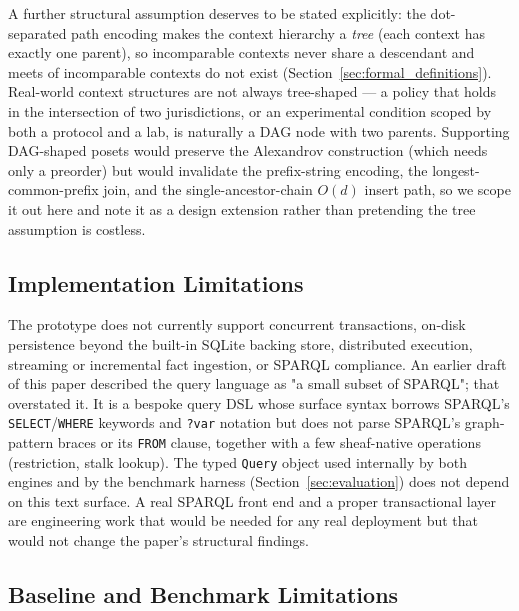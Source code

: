 A further structural assumption deserves to be stated explicitly: the
dot-separated path encoding makes the context hierarchy a \emph{tree}
(each context has exactly one parent), so incomparable contexts never
share a descendant and meets of incomparable contexts do not exist
(Section~\ref{sec:formal_definitions}). Real-world context structures
are not always tree-shaped --- a policy that holds in the intersection
of two jurisdictions, or an experimental condition scoped by both a
protocol and a lab, is naturally a DAG node with two parents. Supporting
DAG-shaped posets would preserve the Alexandrov construction (which
needs only a preorder) but would invalidate the prefix-string encoding,
the longest-common-prefix join, and the single-ancestor-chain
$O(d)$ insert path, so we scope it out here and note it as a design
extension rather than pretending the tree assumption is costless.

\subsection{Implementation Limitations}
\label{sec:limits:implementation}

The prototype does not currently support concurrent transactions, on-disk
persistence beyond the built-in SQLite backing store, distributed
execution, streaming or incremental fact ingestion, or SPARQL compliance.
An earlier draft of this paper described the query language as "a small
subset of SPARQL"; that overstated it. It is a bespoke query DSL whose
surface syntax borrows SPARQL's \texttt{SELECT}/\texttt{WHERE} keywords and
\texttt{?var} notation but does not parse SPARQL's graph-pattern braces or
its \texttt{FROM} clause, together with a few sheaf-native operations
(restriction, stalk lookup). The typed \texttt{Query} object used
internally by both engines and by the benchmark harness
(Section~\ref{sec:evaluation}) does not depend on this text surface. A
real SPARQL front end and a proper transactional layer are engineering
work that would be needed for any real deployment but that would not
change the paper's structural findings.

\subsection{Baseline and Benchmark Limitations}
\label{sec:limits:benchmark}

